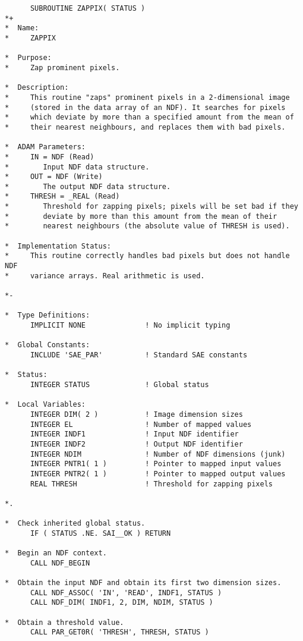 \small
\begin{verbatim}
      SUBROUTINE ZAPPIX( STATUS )
*+
*  Name:
*     ZAPPIX

*  Purpose:
*     Zap prominent pixels.

*  Description:
*     This routine "zaps" prominent pixels in a 2-dimensional image
*     (stored in the data array of an NDF). It searches for pixels
*     which deviate by more than a specified amount from the mean of
*     their nearest neighbours, and replaces them with bad pixels.

*  ADAM Parameters:
*     IN = NDF (Read)
*        Input NDF data structure.
*     OUT = NDF (Write)
*        The output NDF data structure.
*     THRESH = _REAL (Read)
*        Threshold for zapping pixels; pixels will be set bad if they
*        deviate by more than this amount from the mean of their
*        nearest neighbours (the absolute value of THRESH is used).

*  Implementation Status:
*     This routine correctly handles bad pixels but does not handle NDF
*     variance arrays. Real arithmetic is used.

*-
      
*  Type Definitions:
      IMPLICIT NONE              ! No implicit typing

*  Global Constants:
      INCLUDE 'SAE_PAR'          ! Standard SAE constants

*  Status:
      INTEGER STATUS             ! Global status

*  Local Variables:
      INTEGER DIM( 2 )           ! Image dimension sizes
      INTEGER EL                 ! Number of mapped values
      INTEGER INDF1              ! Input NDF identifier
      INTEGER INDF2              ! Output NDF identifier
      INTEGER NDIM               ! Number of NDF dimensions (junk)
      INTEGER PNTR1( 1 )         ! Pointer to mapped input values
      INTEGER PNTR2( 1 )         ! Pointer to mapped output values
      REAL THRESH                ! Threshold for zapping pixels

*.

*  Check inherited global status.
      IF ( STATUS .NE. SAI__OK ) RETURN

*  Begin an NDF context.
      CALL NDF_BEGIN

*  Obtain the input NDF and obtain its first two dimension sizes.
      CALL NDF_ASSOC( 'IN', 'READ', INDF1, STATUS )
      CALL NDF_DIM( INDF1, 2, DIM, NDIM, STATUS )

*  Obtain a threshold value.
      CALL PAR_GET0R( 'THRESH', THRESH, STATUS )


\end{verbatim}
